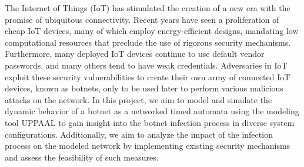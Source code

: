 The Internet of Things (IoT) has stimulated the creation of a new era with the promise of ubiquitous connectivity. Recent years have seen a proliferation of cheap IoT devices, many of which employ energy-efficient designs, mandating low computational resources that preclude the use of rigorous security mechanisms. Furthermore, many deployed IoT devices continue to use default vendor passwords, and many others tend to have weak credentials. Adversaries in IoT exploit these security vulnerabilities to create their own army of connected IoT devices, known as botnets, only to be used later to perform various malicious attacks on the network. In this project, we aim to model and simulate the dynamic behavior of a botnet as a networked timed automata using the modeling tool UPPAAL to gain insight into the botnet infection process in diverse system configurations. Additionally, we aim to analyze the impact of the infection process on the modeled network by implementing existing security mechanisms and assess the feasibility of such measures.